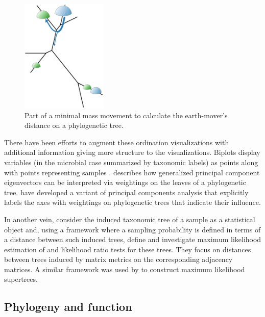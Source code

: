 \documentclass{amsart}
\newcommand{\forarxiv}[1]{#1}
\begin{document}
\newcommand{\dirtpilesLegend}{
    Part of a minimal mass movement to calculate the earth-mover's distance on a phylogenetic tree.
}
\forarxiv{
\begin{figure}
  \begin{center}
    \includegraphics[width=1.6in]{figures/tree_dirtpiles.pdf}
  \end{center}
  \vspace{-5pt}
  \caption{\dirtpilesLegend}
  \label{fig:dirtpiles}
\end{figure}
}

There have been efforts to augment these ordination visualizations with additional information giving more structure to the visualizations.
Biplots display variables (in the microbial case summarized by taxonomic labels) as points along with points representing samples \citep[e.g.][]{hewitt2013bacterial,lozupone2013meta}.
\citet{PurdomAnalyzingDataGraphs08} describes how generalized principal component eigenvectors can be interpreted via weightings on the leaves of a phylogenetic tree.
\citet{matsen2013edge} have developed a variant of principal components analysis that explicitly labels the axes with weightings on phylogenetic trees that indicate their influence.

In another vein, \citet{la2012statistical} consider the induced taxonomic tree of a sample as a statistical object and, using a framework where a sampling probability is defined in terms of a distance between such induced trees, define and investigate maximum likelihood estimation of and likelihood ratio tests for these trees.
They focus on distances between trees induced by matrix metrics on the corresponding adjacency matrices.
A similar framework was used by \citet{steel2008maximum} to construct maximum likelihood supertrees.


\subsection{Phylogeny and function}
\end{document}
